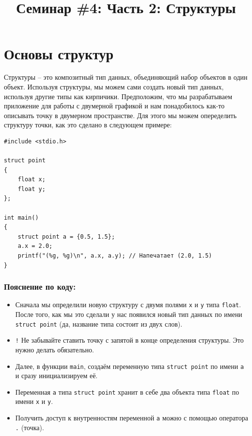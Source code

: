 \documentclass[10pt]{article}
\begin{document}
\title{Семинар \#4: Часть 2: Структуры\vspace{-5ex}}\date{}\maketitle

\section*{Основы структур}

Структуры -- это композитный тип данных, объединяющий набор объектов в один объект. Используя структуры, мы можем сами создать новый тип данных, используя другие типы как кирпичики.
Предположим, что мы разрабатываем приложение для работы с двумерной графикой и нам понадобилось как-то описывать точку в двумерном пространстве. Для этого  мы можем опеределить структуру точки, как это сделано в следующем примере:
\begin{lstlisting}
#include <stdio.h>

struct point 
{
    float x;
    float y;
};

int main() 
{
    struct point a = {0.5, 1.5};
    a.x = 2.0;
    printf("(%g, %g)\n", a.x, a.y); // Напечатает (2.0, 1.5)
}
\end{lstlisting}
\subsubsection*{Пояснение по коду:}
\begin{itemize}
\item Сначала мы определили новую структуру с двумя полями \texttt{x} и \texttt{y} типа \texttt{float}. После того, как мы это сделали у нас появился новый тип данных по имени \texttt{struct point} (да, название типа состоит из двух слов).
\item \texttt{!} Не забывайте ставить точку с запятой в конце определения структуры. Это нужно делать обязательно. 
\item Далее, в функции \texttt{main}, создаём переменную типа \texttt{struct point} по имени \texttt{a} и сразу инициализируем её.
\item Переменная \texttt{a} типа \texttt{struct point} хранит в себе два объекта типа \texttt{float} по имени \texttt{x} и \texttt{y}.
\item Получить доступ к внутренностям переменной \texttt{a} можно с помощью оператора \texttt{.} (точка).
\end{itemize}
\end{document}
